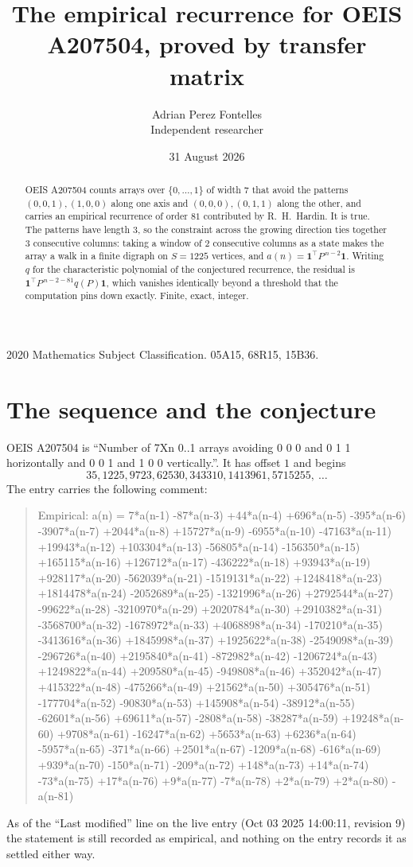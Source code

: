 \documentclass[11pt,a4paper]{article}
\title{The empirical recurrence for OEIS A207504, proved by transfer matrix}
\author{Adrian Perez Fontelles\\ \small Independent researcher}
\date{31 August 2026}
\theoremstyle{plain}
\theoremstyle{definition}
\begin{document}
\maketitle

\begin{abstract}
OEIS A207504 counts arrays over $\{0,\dots,1\}$ of width $7$ that avoid the patterns
$(0,0,1), (1,0,0)$ along one axis and $(0,0,0), (0,1,1)$ along the other, and carries an empirical recurrence of
order $81$ contributed by R.~H.~Hardin. It is true. The patterns have length $3$, so
the constraint across the growing direction ties together $3$ consecutive columns: taking a
window of $2$ consecutive columns as a state makes the array a walk in a finite digraph
on $S=1225$ vertices, and $a(n)=\mathbf{1}^{\!\top}P^{\,n-2}\mathbf{1}$. Writing $q$
for the characteristic polynomial of the conjectured recurrence, the residual is
$\mathbf{1}^{\!\top}P^{\,n-2-81}q(P)\mathbf{1}$, which vanishes identically
beyond a threshold that the computation pins down exactly. Finite, exact, integer.
\end{abstract}

\noindent\small 2020 Mathematics Subject Classification. 05A15, 68R15, 15B36.\normalsize

\section{The sequence and the conjecture}

OEIS A207504 is ``Number of 7Xn 0..1 arrays avoiding 0 0 0 and 0 1 1 horizontally and 0 0 1 and 1 0 0 vertically.''. It has offset
$1$ and begins
\[
35, 1225, 9723, 62530, 343310, 1413961, 5715255,\ \dots
\]
The entry carries the following comment:
\begin{quote}\small
Empirical: a(n) = 7*a(n-1) -87*a(n-3) +44*a(n-4) +696*a(n-5) -395*a(n-6) -3907*a(n-7) +2044*a(n-8) +15727*a(n-9) -6955*a(n-10) -47163*a(n-11) +19943*a(n-12) +103304*a(n-13) -56805*a(n-14) -156350*a(n-15) +165115*a(n-16) +126712*a(n-17) -436222*a(n-18) +93943*a(n-19) +928117*a(n-20) -562039*a(n-21) -1519131*a(n-22) +1248418*a(n-23) +1814478*a(n-24) -2052689*a(n-25) -1321996*a(n-26) +2792544*a(n-27) -99622*a(n-28) -3210970*a(n-29) +2020784*a(n-30) +2910382*a(n-31) -3568700*a(n-32) -1678972*a(n-33) +4068898*a(n-34) -170210*a(n-35) -3413616*a(n-36) +1845998*a(n-37) +1925622*a(n-38) -2549098*a(n-39) -296726*a(n-40) +2195840*a(n-41) -872982*a(n-42) -1206724*a(n-43) +1249822*a(n-44) +209580*a(n-45) -949808*a(n-46) +352042*a(n-47) +415322*a(n-48) -475266*a(n-49) +21562*a(n-50) +305476*a(n-51) -177704*a(n-52) -90830*a(n-53) +145908*a(n-54) -38912*a(n-55) -62601*a(n-56) +69611*a(n-57) -2808*a(n-58) -38287*a(n-59) +19248*a(n-60) +9708*a(n-61) -16247*a(n-62) +5653*a(n-63) +6236*a(n-64) -5957*a(n-65) -371*a(n-66) +2501*a(n-67) -1209*a(n-68) -616*a(n-69) +939*a(n-70) -150*a(n-71) -209*a(n-72) +148*a(n-73) +14*a(n-74) -73*a(n-75) +17*a(n-76) +9*a(n-77) -7*a(n-78) +2*a(n-79) +2*a(n-80) -a(n-81)
\end{quote}
As of the ``Last modified'' line on the live entry (Oct 03 2025 14:00:11, revision
9) the statement is still recorded as empirical, and nothing on the entry
records it as settled either way.
\end{document}

